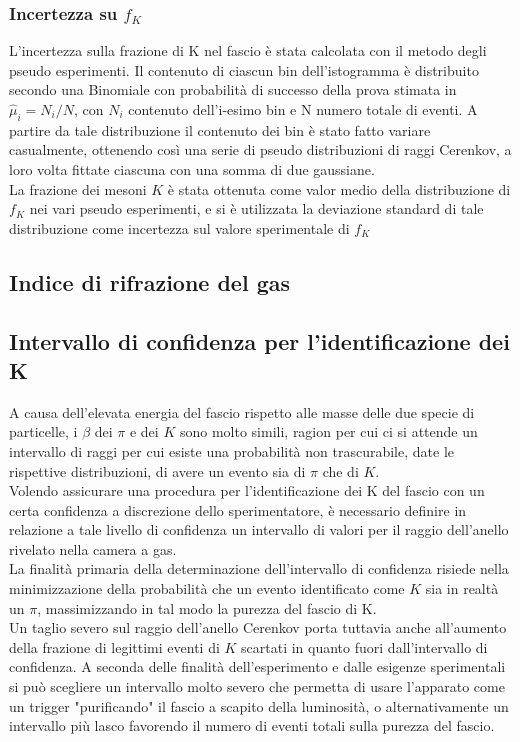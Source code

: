 \documentclass[8pt]{extarticle}
\begin{document}
\subsubsection{Incertezza su $f_K$}
L'incertezza sulla frazione di K nel fascio è stata calcolata con il metodo degli pseudo esperimenti. Il contenuto di ciascun bin dell'istogramma è distribuito secondo una Binomiale con probabilità di successo della prova stimata in $\hat{\mu}_i = N_{i}/N$, con $N_i$ contenuto dell'i-esimo bin e N numero totale di eventi. A partire da tale distribuzione il contenuto dei bin è stato fatto variare casualmente, ottenendo così una serie di pseudo distribuzioni di raggi Cerenkov, a loro volta fittate ciascuna con una somma di due gaussiane.\\
La frazione dei mesoni $K$ è stata ottenuta come valor medio della distribuzione di $f_K$ nei vari pseudo esperimenti, e si è utilizzata la deviazione standard di tale distribuzione come incertezza sul valore sperimentale di $f_K$

\subsection{Indice di rifrazione del gas}

\subsection{Intervallo di confidenza per l'identificazione dei K}
A causa dell'elevata energia del fascio rispetto alle masse delle due specie di particelle, i $\beta$ dei $\pi$ e dei $K$ sono molto simili, ragion per cui ci si attende un intervallo di raggi per cui esiste una probabilità non trascurabile, date le rispettive distribuzioni, di avere un evento sia di $\pi$ che di $K$.\\
Volendo assicurare una procedura per l'identificazione dei K del fascio con un certa confidenza a discrezione dello sperimentatore, è necessario definire in relazione a tale livello di confidenza un intervallo di valori per il raggio dell'anello rivelato nella camera a gas.\\
La finalità primaria della determinazione dell'intervallo di confidenza risiede nella minimizzazione della probabilità che un evento identificato come $K$ sia in realtà un $\pi$, massimizzando in tal modo la purezza del fascio di K.\\
Un taglio severo sul raggio dell'anello Cerenkov porta tuttavia anche all'aumento della frazione di legittimi eventi di $K$ scartati in quanto fuori dall'intervallo di confidenza. A seconda delle finalità dell'esperimento e dalle esigenze sperimentali si può scegliere un intervallo molto severo che permetta di usare l'apparato come un trigger "purificando" il fascio a scapito della luminosità, o alternativamente un intervallo più lasco favorendo il numero di eventi totali sulla purezza del fascio.
\end{document}
